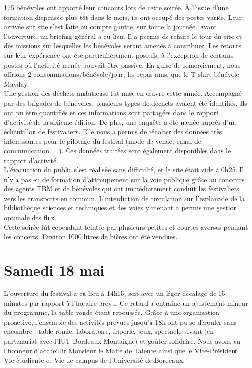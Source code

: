 \documentclass[12pt,a4paper]{report}
\begin{document}
175 bénévoles ont apporté leur concours lors de cette soirée. À l'issue d'une formation dispensée plus tôt dans le mois, ils ont occupé des postes variés. Leur arrivée sur site s'est faite au compte goutte, sur toute la journée. Avant l'ouverture, un briefing général a eu lieu. Il a permis de refaire le tour du site et des missions sur lesquelles les bénévoles seront amenés à contribuer. Les retours sur leur expérience ont été particulièrement positifs, à l'exception de certains postes où l'activité menée pouvait être passive. En guise de remerciement, nous offrions 2 consommations/bénévole/jour, les repas ainsi que le T-shirt bénévole Mayday.\\

Une gestion des déchets ambitieuse fût mise en œuvre cette année. Accompagné par des brigades de bénévoles, plusieurs types de déchets avaient été identifiés. Ils ont pu être quantifiés et ces informations sont partagées dans le rapport d'activité de la sixième édition. De plus, une enquête a été menée auprès d'un échantillon de festivaliers. Elle nous a permis de récolter des données très intéressantes pour le pilotage du festival (mode de venue, canal de communication, ...). Ces données traitées sont également disponibles dans le rapport d'activité.\\

L'évacuation du public s'est réalisée sans difficulté, et le site était vide à 0h25. Il n'y a pas eu de formation d'attroupement sur la voie publique grâce au concours des agents TBM et de bénévoles qui ont immédiatement conduit les festivaliers vers les transports en commun. L'interdiction de circulation sur l'esplanade de la bibliothèque sciences et techniques et des voies y menant a permis une gestion optimale des flux.\\

Cette soirée fût cependant teintée par plusieurs petites et courtes averses pendant les concerts. Environ 1000 litres de bières ont été vendues.

\section{Samedi 18 mai}

L'ouverture du festival a eu lieu à 14h15, soit avec un léger décalage de 15 minutes par rapport à l'horaire prévu. Ce retard a entraîné un ajustement mineur du programme, la table ronde étant repoussée. Grâce à une organisation proactive, l'ensemble des activités prévues jusqu'à 18h ont pu se dérouler sans encombre : table ronde, laboratoire, friperie, jeux, spectacle vivant (en partenariat avec l'IUT Bordeaux Montaigne) et goûter solidaire. Nous avons eu l'honneur d'accueillir Monsieur le Maire de Talence ainsi que le Vice-Président Vie étudiante et Vie de campus de l'Université de Bordeaux.\\
\end{document}
